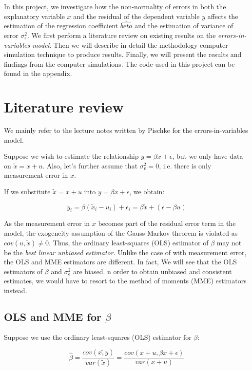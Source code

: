 \documentclass{article}
\begin{document}
In this project, we investigate how the non-normality of errors in both the explanatory variable $x$ and the residual of the dependent variable $y$ affects the estimation of the regression coefficient $\hat{beta}$ and the estimation of variance of error $\sigma^2_\epsilon$.
We first perform a literature review on existing results on the \textit{errors-in-variables model}.
Then we will describe in detail the methodology computer simulation technique to produce results.
Finally, we will present the results and findings from the computer simulations.
The code used in this project can be found in the appendix.

\section{Literature review}

We mainly refer to the lecture notes written by Pischke \cite{lecturenotes} for the errors-in-variables model. 

Suppose we wish to estimate the relationship $y = \beta x + \epsilon$, but we only have data on $\tilde{x} = x + u$. Also, let's further assume that $\sigma_v^2 = 0$, i.e. there is only measurement error in $x$.

If we substitute $\tilde{x} = x+u$ into $y = \beta x + \epsilon$, we obtain:

\[
    y_i = \beta(\tilde{x}_i - u_i) + \epsilon_i = \beta \tilde{x} + (\epsilon - \beta u)
\]

As the measurement error in $x$ becomes part of the residual error term in the model, the exogeneity assumption of the Gauss-Markov theorem is violated as $cov(u, \tilde{x}) \neq 0$.
Thus, the ordinary least-squares (OLS) estimator of $\beta$ may not be the \textit{best linear unbiased estimator}.
Unlike the case of with measurement error, the OLS and MME estimators are different.
In fact, We will see that the OLS estimators of $\beta$ and $\sigma_\epsilon^2$ are biased. 
n order to obtain unbiased and consistent estimates, we would have to resort to the method of moments (MME) estimators instead. 

\subsection{OLS and MME for $\beta$}

Suppose we use the ordinary least-squares (OLS) estimator for $\beta$:

\[
\hat{\beta} = \frac{cov(\tilde{x, y})}{var(\tilde{x})} = \frac{cov(x+u, \beta x + \epsilon)}{var(x + u)}
\]
\end{document}
